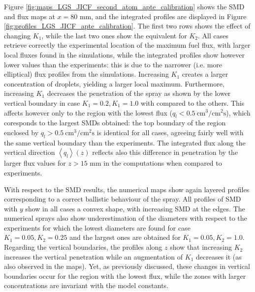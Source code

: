 Figure \ref{fig:maps_LGS_JICF_second_atom_apte_calibration} shows the SMD and flux maps at $x = 80$ mm, and the integrated profiles are displayed in Figure \ref{fig:profiles_LGS_JICF_apte_calibration}. The first two rows shows the effect of changing $K_1$, while the last two ones show the equivalent for $K_2$. All cases retrieve correctly the experimental location of the maximum fuel flux, with larger local fluxes found in the simulations, while the integrated profiles show however lower values than the experiments: this is due to the narrower (i.e. more elliptical) flux profiles from the simulations. Increasing $K_1$ creates a larger concentration of droplets, yielding a larger local maximum. Furthermore, increasing $K_1$ decreases the penetration of the spray as shown by the lower vertical boundary in case $K_1 = 0.2, K_1 = 1.0$ with compared to the others. This affects however only to the region with the lowest flux ($q_l < 0.5~\mathrm{cm}^3/\mathrm{cm}^2\mathrm{s}$), which coresponds to the largest SMDs obtained: the top boundary of the region enclosed by $q_l > 0.5~\mathrm{cm}^3/\mathrm{cm}^2\mathrm{s}$ is identical for all cases, agreeing fairly well with the same vertical boundary than the experiments. The integrated flux along the vertical direction $\left\langle q_l \right\rangle \left( z \right)$ reflects also this difference in penetration by the larger flux values for $z > 15$ mm in the computations when compared to experiments.  

With respect to the SMD results, the numerical maps show again layered profiles corresponding to a correct ballistic behaviour of the spray. All profiles of SMD with $y$ show in all cases a convex shape, with increasing SMD at the edges. The numerical sprays also show underestimation of the diameters with respect to the experiments for which the lowest diameters are found for case $K_1 = 0.05, K_2 = 0.25$ and the largest ones are obtained for $K_1 = 0.05, K_2 = 1.0$. Regarding the vertical boundaries, the profiles along $z$ show that increasing $K_2$ increases the vertical penetration while an augmentation of $K_1$ decreases it (as also observed in the maps). Yet, as previously discussed, these changes in vertical boundaries occur for the region with the lowest flux, while the zones with larger concentrations are invariant with the model constants. 
 
